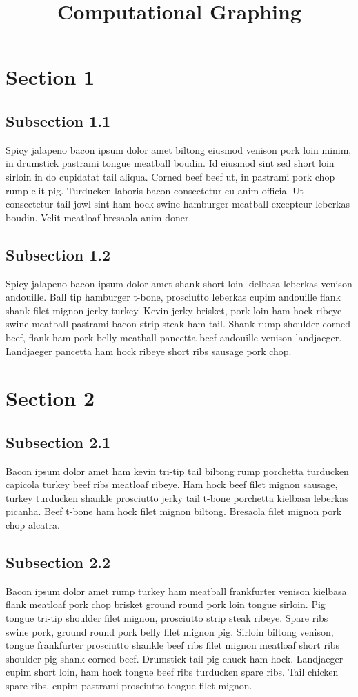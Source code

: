 \documentclass[12pt]{memoir}
\title{Computational Graphing}
\begin{document}
    \newcommand{\documentname}{Test Reports}
    
    \newpage

	\tableofcontents

	\newpage
	
	\section{Section 1}
	\subsection{Subsection 1.1}
	Spicy jalapeno bacon ipsum dolor amet biltong eiusmod venison pork loin minim, in drumstick pastrami tongue meatball boudin. Id eiusmod sint sed short loin sirloin in do cupidatat tail aliqua. Corned beef beef ut, in pastrami pork chop rump elit pig. Turducken laboris bacon consectetur eu anim officia. Ut consectetur tail jowl sint ham hock swine hamburger meatball excepteur leberkas boudin. Velit meatloaf bresaola anim doner.
	
	\subsection{Subsection 1.2}
	Spicy jalapeno bacon ipsum dolor amet shank short loin kielbasa leberkas venison andouille. Ball tip hamburger t-bone, prosciutto leberkas cupim andouille flank shank filet mignon jerky turkey. Kevin jerky brisket, pork loin ham hock ribeye swine meatball pastrami bacon strip steak ham tail. Shank rump shoulder corned beef, flank ham pork belly meatball pancetta beef andouille venison landjaeger. Landjaeger pancetta ham hock ribeye short ribs sausage pork chop.
	
	\newpage
	\section{Section 2}
	\subsection{Subsection 2.1}
	Bacon ipsum dolor amet ham kevin tri-tip tail biltong rump porchetta turducken capicola turkey beef ribs meatloaf ribeye. Ham hock beef filet mignon sausage, turkey turducken shankle prosciutto jerky tail t-bone porchetta kielbasa leberkas picanha. Beef t-bone ham hock filet mignon biltong. Bresaola filet mignon pork chop alcatra.
	
	\subsection{Subsection 2.2}
	Bacon ipsum dolor amet rump turkey ham meatball frankfurter venison kielbasa flank meatloaf pork chop brisket ground round pork loin tongue sirloin. Pig tongue tri-tip shoulder filet mignon, prosciutto strip steak ribeye. Spare ribs swine pork, ground round pork belly filet mignon pig. Sirloin biltong venison, tongue frankfurter prosciutto shankle beef ribs filet mignon meatloaf short ribs shoulder pig shank corned beef. Drumstick tail pig chuck ham hock. Landjaeger cupim short loin, ham hock tongue beef ribs turducken spare ribs. Tail chicken spare ribs, cupim pastrami prosciutto tongue filet mignon.
	
\end{document}
